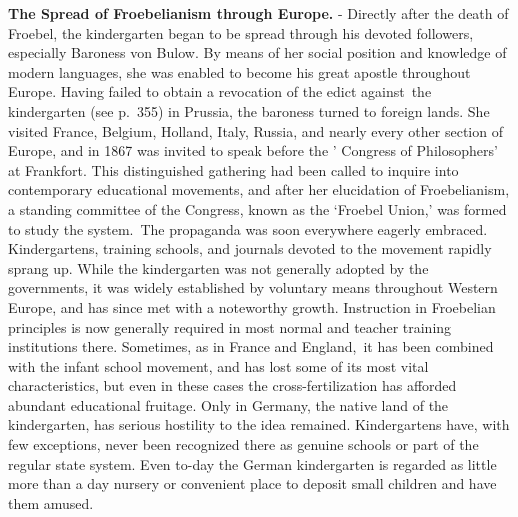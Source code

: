 \documentclass[]{book}
\begin{document}
\textbf{The Spread of Froebelianism through Europe.} - Directly after the death of Froebel, the kindergarten began to be spread through his devoted followers, especially Baroness von Bulow. By means of her social position and knowledge of modern languages, she was enabled to become his great apostle throughout Europe. Having failed to obtain a revocation of the edict against~the kindergarten (see p.~355) in Prussia, the baroness turned to foreign lands. She visited France, Belgium, Holland, Italy, Russia, and nearly every other section of Europe, and in 1867 was invited to speak before the ' Congress of Philosophers' at Frankfort. This distinguished gathering had been called to inquire into contemporary educational movements, and after her elucidation of Froebelianism, a standing committee of the Congress, known as the `Froebel Union,' was formed to study the system.~The propaganda was soon everywhere eagerly embraced. Kindergartens, training schools, and journals devoted to the movement rapidly sprang up. While the kindergarten was not generally adopted by the governments, it was widely established by voluntary means throughout Western Europe, and has since met with a noteworthy growth. Instruction in Froebelian principles is now generally required in most normal and teacher training institutions there. Sometimes, as in France and England,~it has been combined with the infant school movement, and has lost some of its most vital characteristics, but even in these cases the cross-fertilization has afforded abundant educational fruitage. Only in Germany, the native land of the kindergarten, has serious hostility to the idea remained. Kindergartens have, with few exceptions, never been recognized there as genuine schools or part of the regular state system. Even to-day the German kindergarten is regarded as little more than a day nursery or convenient place to deposit small children and have them amused.
\end{document}
